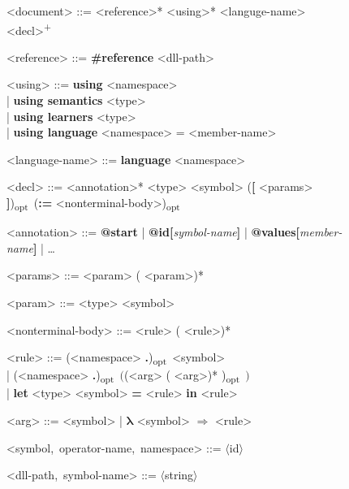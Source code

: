 \begin{figure}[p!]
    \uwsinglespace
    \centering
    \newcommand{\onep}{\textsuperscript{+}}
    \newcommand{\optional}{\textsubscript{\textsf{opt}}\ }
    \renewcommand{\synt}[1]{\textsl{#1}}
    \renewcommand{\syntleft}{\slshape}
    \renewcommand{\syntright}{}
    \begin{tcolorbox}
    \begin{grammar}
        \parskip=3pt
        <document> ::= <reference>* <using>* <languge-name> <decl>\onep

        <reference> ::= \textbf{\#reference} <dll-path> \pmb{;}

        <using> ::= \textbf{using} <namespace> \pmb{;} \\
            | \textbf{using semantics} <type> \pmb{;} \\
            | \textbf{using learners} <type> \pmb{;} \\
            | \textbf{using language} <namespace> = <member-name> \pmb{;}

        <language-name> ::= \textbf{language} <namespace> \pmb{;}

        <decl> ::= <annotation>* <type> <symbol> (\textbf{[} <params> \textbf{]})\optional (\textbf{:=} <nonterminal-body>)\optional \pmb{;}

        <annotation> ::= \textbf{@start} | \textbf{@id[}\synt{symbol-name}\textbf{]} | \textbf{@values[}\synt{member-name}\textbf{]} | \dots

        <params> ::= <param> (\pmb{,} <param>)*

        <param> ::= <type> <symbol>

        <nonterminal-body> ::= <rule> (\pmb{|} <rule>)*

        <rule> ::= (<namespace> \textbf{.})\optional <symbol> \\
        | (<namespace> \textbf{.})\optional <operator-name>$\pmb{\bigl(}$(<arg> (\pmb{,} <arg>)* )\optional$\pmb{\bigr)}$ \\
        | \textbf{let} <type> <symbol> \textbf{=} <rule> \textbf{in} <rule>

        <arg> ::= <symbol> | $\bm{\lambda}$ <symbol> $\bm{\Rightarrow}$ <rule>

        <symbol,~operator-name,~namespace> ::= $\langle$\textup{id}$\rangle$

        <dll-path,~symbol-name> ::= \pmb{\textquotesingle}$\langle$\textup{string}$\rangle$\pmb{\textquotesingle}


\end{grammar}
\end{tcolorbox}
\end{figure}
